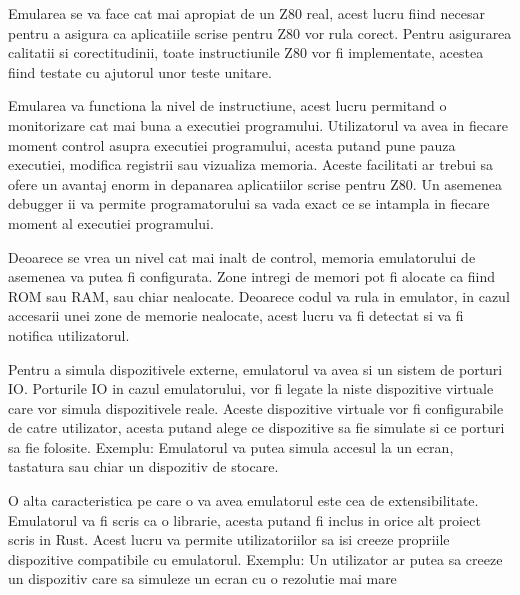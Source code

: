 \documentclass[titlepage,12pt]{article}
\begin{document}
Emularea se va face cat mai apropiat de un Z80 real, acest lucru fiind necesar pentru a asigura ca aplicatiile scrise pentru Z80 vor rula corect.
Pentru asigurarea calitatii si corectitudinii, toate instructiunile Z80 vor fi implementate, acestea fiind testate cu ajutorul unor teste unitare.

Emularea va functiona la nivel de instructiune, acest lucru permitand o monitorizare cat mai buna a executiei programului.
Utilizatorul va avea in fiecare moment control asupra executiei programului, acesta putand pune pauza executiei, modifica registrii sau vizualiza memoria.
Aceste facilitati ar trebui sa ofere un avantaj enorm in depanarea aplicatiilor scrise pentru Z80.
Un asemenea debugger ii va permite programatorului sa vada exact ce se intampla in fiecare moment al executiei programului.

Deoarece se vrea un nivel cat mai inalt de control, memoria emulatorului de asemenea va putea fi configurata.
Zone intregi de memori pot fi alocate ca fiind \ac {ROM} sau \ac {RAM}, sau chiar nealocate.
Deoarece codul va rula in emulator, in cazul accesarii unei zone de memorie nealocate, acest lucru va fi detectat si va fi notifica utilizatorul.

Pentru a simula dispozitivele externe, emulatorul va avea si un sistem de porturi \ac {IO}.
Porturile \ac {IO} in cazul emulatorului, vor fi legate la niste dispozitive virtuale care vor simula dispozitivele reale.
Aceste dispozitive virtuale vor fi configurabile de catre utilizator, acesta putand alege ce dispozitive sa fie simulate si ce porturi sa fie folosite.
Exemplu: Emulatorul va putea simula accesul la un ecran, tastatura sau chiar un dispozitiv de stocare.

O alta caracteristica pe care o va avea emulatorul este cea de extensibilitate.
Emulatorul va fi scris ca o librarie, acesta putand fi inclus in orice alt proiect scris in Rust.
Acest lucru va permite utilizatoriilor sa isi creeze propriile dispozitive compatibile cu emulatorul.
Exemplu: Un utilizator ar putea sa creeze un dispozitiv care sa simuleze un ecran cu o rezolutie mai mare



%
\end{document}
